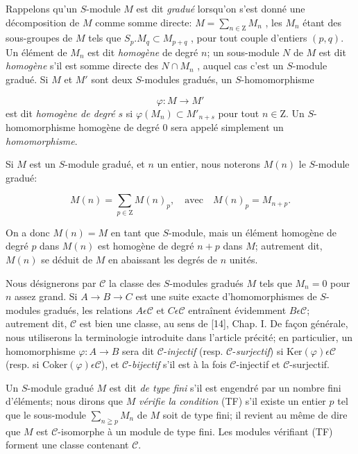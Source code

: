 Rappelons qu'un $S$-module $M$ est dit \textit{gradué} lorsqu'on s'est donné une décomposition de $M$ comme somme directe: $M = \sum_{n \in \mathrm{Z}} M_n$ , les $M_n$ étant des sous-groupes de $M$ tels que $S_p.M_q \subset M_{p+q}$ , pour tout couple d'entiers $(p, q)$. Un élément de $M_n$ est dit \textit{homogène} de degré $n$; un sous-module $N$ de $M$ est dit \textit{homogène} s'il est somme directe des $N \cap M_n$ , auquel cas c'est un $S$-module gradué. Si $M$ et $M'$ sont deux $S$-modules gradués, un $S$-homomorphisme

\begin{equation*}
\varphi : M \to M'
\end{equation*}
est dit \textit{homogène de degré $s$} si $\varphi(M_n) \subset M'_{n+s}$ pour tout $n \in \mathrm{Z}$. Un $S$-homomorphisme homogène de degré 0 sera appelé simplement un \textit{homomorphisme}.

Si $M$ est un $S$-module gradué, et $n$ un entier, nous noterons $M(n)$ le $S$-module gradué:

\begin{equation*}
M(n) = \sum_{p \in \mathrm{Z}} M(n)_p , \quad \mathrm{avec} \quad M(n)_p = M_{n+p} .
\end{equation*}


On a donc $M(n) = M$ en tant que $S$-module, mais un élément homogène de degré $p$ dans $M(n)$ est homogène de degré $n + p$ dans $M$; autrement dit, $M(n)$ se déduit de $M$ en abaissant les degrés de $n$ unités.

Nous désignerons par $\mathcal{C}$ la classe des $S$-modules gradués $M$ tels que $M_n = 0$ pour $n$ assez grand. Si $A \to B \to C$ est une suite exacte d'homomorphismes de $S$-modules gradués, les relations $A \epsilon \mathcal{C}$ et $C \epsilon \mathcal{C}$ entraînent évidemment $B \epsilon \mathcal{C}$; autrement dit, $\mathcal{C}$ est bien une classe, au sens de [14], Chap. I. De façon générale, nous utiliserons la terminologie introduite dans l'article précité; en particulier, un homomorphisme $\varphi : A \to B$ sera dit $\mathcal{C}$-\textit{injectif} (resp. $\mathcal{C}$-\textit{surjectif}) si $\mathrm{Ker}(\varphi) \epsilon \mathcal{C}$ (resp. si $\mathrm{Coker}(\varphi) \epsilon \mathcal{C}$), et $\mathcal{C}$-\textit{bijectif} s'il est à la fois $\mathcal{C}$-injectif et $\mathcal{C}$-surjectif.

Un $S$-module gradué $M$ est dit \textit{de type fini} s'il est engendré par un nombre fini d'éléments; nous dirons que $M$ \textit{vérifie la condition} (TF) s'il existe un entier $p$ tel que le sous-module $\sum_{n \geqq p} M_n$ de $M$ soit de type fini; il revient au même de dire que $M$ est $\mathcal{C}$-isomorphe à un module de type fini. Les modules vérifiant (TF) forment une classe contenant $\mathcal{C}$.

